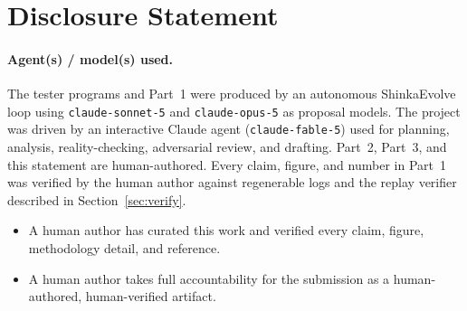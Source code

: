 \documentclass{article}
\begin{document}
\section{Disclosure Statement}

\paragraph{Agent(s) / model(s) used.}
The tester programs and Part~1 were produced by an autonomous ShinkaEvolve loop using \texttt{claude-sonnet-5} and
\texttt{claude-opus-5} as proposal models. The project was driven by an interactive Claude agent (\texttt{claude-fable-5})
used for planning, analysis, reality-checking, adversarial review, and drafting. Part~2, Part~3, and this statement are
human-authored. Every claim, figure, and number in Part~1 was verified by the human author against regenerable logs and
the replay verifier described in Section~\ref{sec:verify}.

\begin{itemize}
  \item[$\boxtimes$] A human author has curated this work and verified every claim,
    figure, methodology detail, and reference.
  \item[$\boxtimes$] A human author takes full accountability for the submission as
    a human-authored, human-verified artifact.
\end{itemize}





\end{document}
